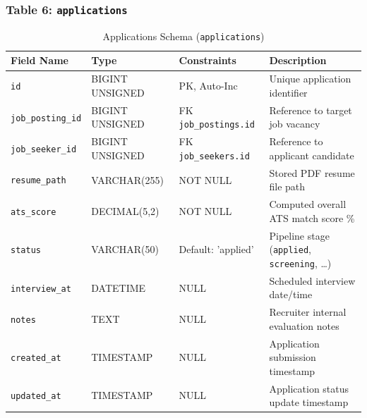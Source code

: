 \subsubsection{Table 6: \texttt{applications}}
\begin{table}[H]
\centering
\small
\caption{Applications Schema (\texttt{applications})}
\label{tab:schema_applications}
\begin{tabular}{|p{3cm}|p{2.8cm}|p{2.2cm}|p{5.5cm}|}
\hline
\textbf{Field Name} & \textbf{Type} & \textbf{Constraints} & \textbf{Description} \\ \hline
\texttt{id} & BIGINT UNSIGNED & PK, Auto-Inc & Unique application identifier \\ \hline
\texttt{job\_posting\_id}& BIGINT UNSIGNED & FK \texttt{job\_postings.id}& Reference to target job vacancy \\ \hline
\texttt{job\_seeker\_id} & BIGINT UNSIGNED & FK \texttt{job\_seekers.id} & Reference to applicant candidate \\ \hline
\texttt{resume\_path} & VARCHAR(255) & NOT NULL & Stored PDF resume file path \\ \hline
\texttt{ats\_score} & DECIMAL(5,2) & NOT NULL & Computed overall ATS match score \% \\ \hline
\texttt{status} & VARCHAR(50) & Default: 'applied' & Pipeline stage (\texttt{applied}, \texttt{screening}, \dots) \\ \hline
\texttt{interview\_at} & DATETIME & NULL & Scheduled interview date/time \\ \hline
\texttt{notes} & TEXT & NULL & Recruiter internal evaluation notes \\ \hline
\texttt{created\_at} & TIMESTAMP & NULL & Application submission timestamp \\ \hline
\texttt{updated\_at} & TIMESTAMP & NULL & Application status update timestamp \\ \hline
\end{tabular}
\end{table}

